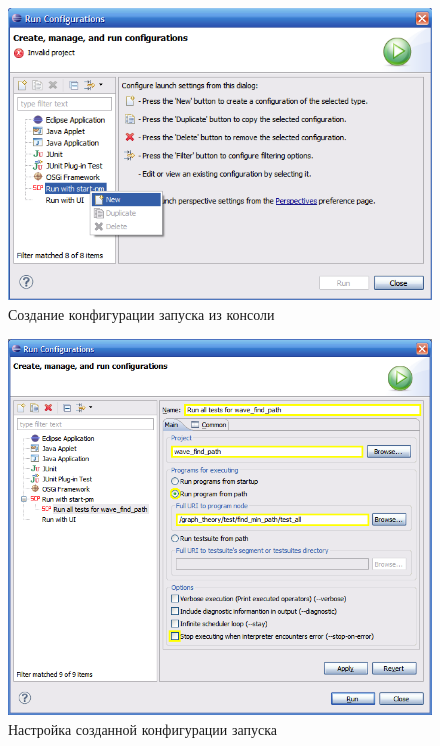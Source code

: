 \begin{figure}[h!]
  \centering
  \includegraphics[scale=0.7]{images/5/setup/7_Select_run_with_start_pm}
  \caption{Создание конфигурации запуска из консоли}
  \label{fig:Setup_Select_run_with_start_pm}
\end{figure}

\begin{figure}[h!]
  \centering
  \includegraphics[scale=0.7]{images/5/setup/8_Setup_run_with_start_pm}
  \caption{Настройка созданной конфигурации запуска}
  \label{fig:Setup_Setup_run_with_start_pm}
\end{figure}

